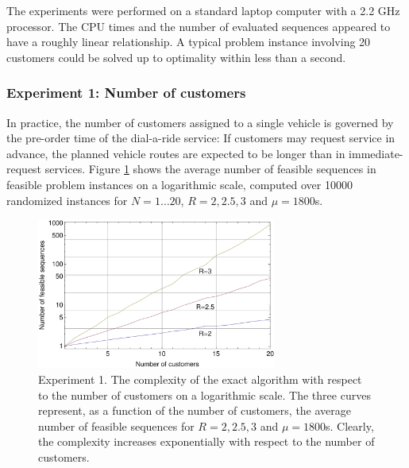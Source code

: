 \documentclass[dissertation,draft*]{aaltoseries}
\begin{document}
The experiments were performed on a standard laptop computer with a 2.2 GHz processor. 
The CPU times and the number of evaluated sequences appeared to have a roughly linear relationship.
A typical problem instance involving 20 customers could be solved up to optimality within less than a second.













\subsubsection{Experiment 1: Number of customers}
In practice, the number of customers assigned to a single vehicle is governed by the
pre-order time of the dial-a-ride service: If customers may request service in
advance, the planned vehicle routes are expected to be longer than in immediate-request
services. Figure \ref{nvertailu01} shows the average number of feasible sequences in feasible problem instances 
on a logarithmic scale, computed over 10000
randomized instances for $N=1\ldots 20$, $R = 2,2.5,3$ and $\mu = 1800$s.

\begin{figure}[ht]
\begin{center}
\includegraphics[width=0.7\textwidth]{nvertailu01.pdf}
\caption{Experiment 1. The complexity of the exact algorithm with respect to the number of customers on a logarithmic scale. 
The three curves represent, as a function of the number of customers, the average number of feasible sequences 
for $R=2,2.5,3$ and $\mu=1800$s. Clearly, the complexity increases exponentially with respect
to the number of customers.}
\label{nvertailu01}
\end{center}
\end{figure}
\end{document}
